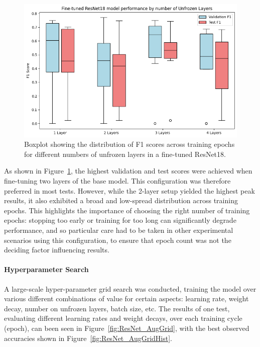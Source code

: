                     \begin{figure}
                        \centering
                        \includegraphics[width=\textwidth]{images/ResNetLayerTests.png}
                        \caption{Boxplot showing the distribution of F1 scores across training epochs for different numbers of unfrozen layers in a fine-tuned ResNet18.} \label{fig:ResNetLayers}
                    \end{figure}
                    
                    As shown in Figure~\ref{fig:ResNetLayers}, the highest validation and test scores were achieved when fine-tuning two layers of the base model. This configuration was therefore preferred in most tests. However, while the 2-layer setup yielded the highest peak results, it also exhibited a broad and low-spread distribution across training epochs. This highlights the importance of choosing the right number of training epochs: stopping too early or training for too long can significantly degrade performance, and so particular care had to be taken in other experimental scenarios using this configuration, to ensure that epoch count was not the deciding factor influencing results.
        
                    \paragraph{Hyperparameter Search}
        
                        A large-scale hyper-parameter grid search was conducted, training the model over various different combinations of value for certain aspects: learning rate, weight decay, number on unfrozen layers, batch size, etc. The results of one test, evaluating different learning rates and weight decays, over each training cycle (epoch), can been seen in Figure~\ref{fig:ResNet_AugGrid}, with the best observed accuracies shown in Figure~\ref{fig:ResNet_AugGridHist}.
                
